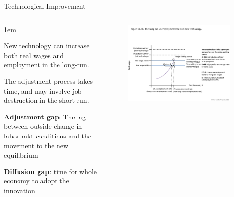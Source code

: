 \documentclass[11pt,aspectratio=43,usenames,dvipsnames]{beamer}
\let\olditemize=\itemize
\let\endolditemize=\enditemize
\renewenvironment{itemize}{\olditemize \itemsep1em}{\endolditemize}
\theoremstyle{definition}
\begin{document}
\begin{frame}{Technological Improvement}
\label{slide:Technological_Improvement}
    \begin{columns}
        \begin{column}{0.3\textwidth}
            \begin{itemize}
                \item<only@1> New technology can increase both real wages and employment in the long-run.
                \item<only@1> The adjustment process takes time, and may involve job destruction in the short-run.
                \item<only@2> \textbf{Adjustment gap}: The lag between outside change in labor mkt conditions and the movement to the new equilibrium.
                \item<only@2> \textbf{Diffusion gap}: time for whole economy to adopt the innovation
            \end{itemize}
        \end{column}
        \begin{column}{0.7\textwidth}
            \begin{figure}
                \centering
                \includegraphics[width=\textwidth]{./figures/11.pdf}
            \end{figure}

        \end{column}
    \end{columns}

\end{frame}
\end{document}
